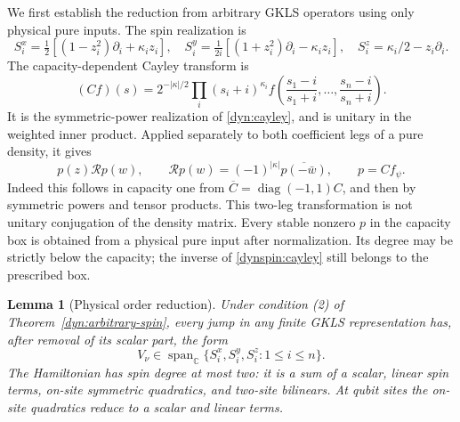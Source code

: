 \documentclass[reqno]{amsart}
\newtheorem{lemma}[theorem]{Lemma}
\theoremstyle{definition}
\theoremstyle{remark}
\newcommand{\C}{\mathbb C}
\DeclareMathOperator{\diag}{diag}
\begin{document}
We first establish the reduction from arbitrary GKLS operators using
only physical pure inputs.  The spin realization is
\begin{equation}\label{dynspin:spin-action}
 S_i^x=\tfrac12[(1-z_i^2)\partial_i+\kappa_i z_i],\quad
 S_i^y=\tfrac1{2i}[(1+z_i^2)\partial_i-\kappa_i z_i],\quad
 S_i^z=\kappa_i/2-z_i\partial_i.
\end{equation}
The capacity-dependent Cayley transform is
\begin{equation}\label{dynspin:cayley}
 (Cf)(s)=2^{-|\kappa|/2}\prod_i(s_i+i)^{\kappa_i}
 f\left(\frac{s_1-i}{s_1+i},\ldots,
         \frac{s_n-i}{s_n+i}\right).
\end{equation}
It is the symmetric-power realization of \eqref{dyn:cayley}, and is
unitary in the weighted inner product.  Applied separately to both
coefficient legs of a pure density, it gives
\begin{equation}\label{dynspin:reflection}
 p(z)\mathscr Rp(w),\qquad
 \mathscr Rp(w)=(-1)^{|\kappa|}\overline{p(-\bar w)},\qquad p=Cf_\psi.
\end{equation}
Indeed this follows in capacity one from
$\overline C=\diag(-1,1)C$, and then by symmetric powers and tensor
products.  This two-leg transformation is not unitary conjugation of
the density matrix.  Every stable nonzero $p$ in the capacity box is
obtained from a physical pure input after normalization.  Its degree
may be strictly below the capacity; the inverse of
\eqref{dynspin:cayley} still belongs to the prescribed box.

\begin{lemma}[Physical order reduction]\label{dynspin:order}
Under condition (2) of Theorem~\ref{dyn:arbitrary-spin}, every jump in any
finite GKLS representation has, after removal of its scalar part, the form
\[
 V_\nu\in\operatorname{span}_{\C}\{S_i^x,S_i^y,S_i^z:1\leq i\leq n\}.
\]
The Hamiltonian has spin degree at most two: it is a sum of a scalar,
linear spin terms, on-site symmetric quadratics, and two-site bilinears.
At qubit sites the on-site quadratics reduce to a scalar and linear terms.
\end{lemma}
\end{document}
